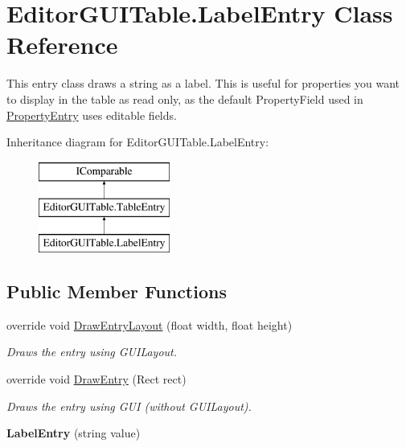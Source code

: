 \hypertarget{class_editor_g_u_i_table_1_1_label_entry}{}\section{Editor\+G\+U\+I\+Table.\+Label\+Entry Class Reference}
\label{class_editor_g_u_i_table_1_1_label_entry}


This entry class draws a string as a label. This is useful for properties you want to display in the table as read only, as the default Property\+Field used in \mbox{\hyperlink{class_editor_g_u_i_table_1_1_property_entry}{Property\+Entry}} uses editable fields.  


Inheritance diagram for Editor\+G\+U\+I\+Table.\+Label\+Entry\+:\begin{figure}[H]
\begin{center}
\leavevmode
\includegraphics[height=3.000000cm]{class_editor_g_u_i_table_1_1_label_entry}
\end{center}
\end{figure}
\subsection*{Public Member Functions}
\begin{DoxyCompactItemize}
\item 
override void \mbox{\hyperlink{class_editor_g_u_i_table_1_1_label_entry_a1bf901bb1f193f4c7ff842d898968572}{Draw\+Entry\+Layout}} (float width, float height)
\begin{DoxyCompactList}\small\item\em Draws the entry using G\+U\+I\+Layout. \end{DoxyCompactList}\item 
override void \mbox{\hyperlink{class_editor_g_u_i_table_1_1_label_entry_a94247717318efb4e51347519e0b985dc}{Draw\+Entry}} (Rect rect)
\begin{DoxyCompactList}\small\item\em Draws the entry using G\+UI (without G\+U\+I\+Layout). \end{DoxyCompactList}\item 
\mbox{\label{class_editor_g_u_i_table_1_1_label_entry_a072a6572ae589178320e873f26f883f8}} 
{\bfseries Label\+Entry} (string value)
\end{DoxyCompactItemize}
